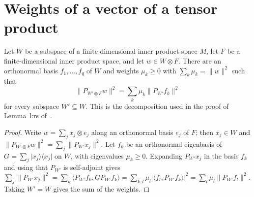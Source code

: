 \section{Weights of a vector of a tensor product}

\begin{theorem}
    \label{thm:tensor_weights}
    \leanok
    Let $W$ be a subspace of a finite-dimensional inner product space $M$,
    let $F$ be a finite-dimensional inner product space, and let
    $w\in W\otimes F$. There are an orthonormal basis $f_1,\dots,f_q$ of $W$
    and weights $\mu_k\ge0$ with $\sum_k\mu_k=\lVert w\rVert^2$ such that
    \[
        \lVert P_{W'\otimes F}w\rVert^2=\sum_k\mu_k\lVert P_{W'}f_k\rVert^2
    \]
    for every subspace $W'\subseteq W$. This is the decomposition used in
    the proof of Lemma~l:rs of~\cite[lines 539--541]{Arad2016RigorousRG}.
\end{theorem}

\begin{proof}
    \leanok
    Write $w=\sum_jx_j\otimes e_j$ along an orthonormal basis $e_j$ of $F$;
    then $x_j\in W$ and $\lVert P_{W'\otimes F}w\rVert^2
    =\sum_j\lVert P_{W'}x_j\rVert^2$. Let $f_k$ be an orthonormal eigenbasis
    of $G=\sum_j\lvert x_j\rangle\langle x_j\rvert$ on $W$, with eigenvalues
    $\mu_k\ge0$. Expanding $P_{W'}x_j$ in the basis $f_k$ and using that
    $P_{W'}$ is self-adjoint gives
    $\sum_j\lVert P_{W'}x_j\rVert^2=\sum_k\langle P_{W'}f_k,GP_{W'}f_k\rangle
    =\sum_{k,l}\mu_l\lvert\langle f_l,P_{W'}f_k\rangle\rvert^2
    =\sum_l\mu_l\lVert P_{W'}f_l\rVert^2$. Taking $W'=W$ gives the sum of
    the weights.
\end{proof}
